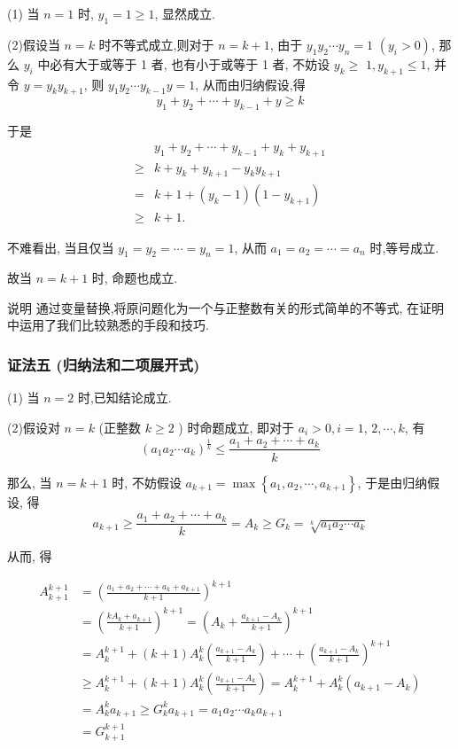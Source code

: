 (1) 当 $n=1$ 时, $y_{1}=1 \geqslant 1$, 显然成立.

(2)假设当 $n=k$ 时不等式成立,则对于 $n=k+1$, 由于 $y_{1} y_{2} \cdots y_{n}=1$ $\left(y_{i}>0\right)$, 那么 $y_{i}$ 中必有大于或等于 1 者, 也有小于或等于 1 者, 不妨设 $y_{k} \geqslant$ $1, y_{k+1} \leqslant 1$, 并令 $y=y_{k} y_{k+1}$, 则 $y_{1} y_{2} \cdots y_{k-1} y=1$, 从而由归纳假设,得
$$
y_{1}+y_{2}+\cdots+y_{k-1}+y \geqslant k
$$

于是
$$
\begin{aligned}
& y_{1}+y_{2}+\cdots+y_{k-1}+y_{k}+y_{k+1} \\
\geqslant & k+y_{k}+y_{k+1}-y_{k} y_{k+1} \\
= & k+1+\left(y_{k}-1\right)\left(1-y_{k+1}\right) \\
\geqslant & k+1 .
\end{aligned}
$$

不难看出, 当且仅当 $y_{1}=y_{2}=\cdots=y_{n}=1$, 从而 $a_{1}=a_{2}=\cdots=a_{n}$ 时,等号成立.

故当 $n=k+1$ 时, 命题也成立.

说明 通过变量替换,将原问题化为一个与正整数有关的形式简单的不等式, 在证明中运用了我们比较熟悉的手段和技巧.

\subsubsection*{证法五 (归纳法和二项展开式)}

(1) 当 $n=2$ 时,已知结论成立.

(2)假设对 $n=k$ (正整数 $k \geqslant 2$ ) 时命题成立, 即对于 $a_{i}>0, i=1$, $2, \cdots, k$, 有
$$
\left(a_{1} a_{2} \cdots a_{k}\right)^{\frac{1}{k}} \leqslant \frac{a_{1}+a_{2}+\cdots+a_{k}}{k}
$$

那么, 当 $n=k+1$ 时, 不妨假设 $a_{k+1}=\max \left\{a_{1}, a_{2}, \cdots, a_{k+1}\right\}$, 于是由归纳假设, 得
$$
a_{k+1} \geqslant \frac{a_{1}+a_{2}+\cdots+a_{k}}{k}=A_{k} \geqslant G_{k}=\sqrt[k]{a_{1} a_{2} \cdots a_{k}}
$$

从而, 得


\begin{align*}
A_{k+1}^{k+1} & =\left(\frac{a_{1}+a_{2}+\cdots+a_{k}+a_{k+1}}{k+1}\right)^{k+1} \\
& =\left(\frac{k A_{k}+a_{k+1}}{k+1}\right)^{k+1}=\left(A_{k}+\frac{a_{k+1}-A_{k}}{k+1}\right)^{k+1}  \tag{8}\\
& =A_{k}^{k+1}+(k+1) A_{k}^{k}\left(\frac{a_{k+1}-A_{k}}{k+1}\right)+\cdots+\left(\frac{a_{k+1}-A_{k}}{k+1}\right)^{k+1}  \tag{9}\\
& \geqslant A_{k}^{k+1}+(k+1) A_{k}^{k}\left(\frac{a_{k+1}-A_{k}}{k+1}\right)=A_{k}^{k+1}+A_{k}^{k}\left(a_{k+1}-A_{k}\right)  \tag{1}\\
& =A_{k}^{k} a_{k+1} \geqslant G_{k}^{k} a_{k+1}=a_{1} a_{2} \cdots a_{k} a_{k+1}  \tag{1}\\
& =G_{k+1}^{k+1} \tag{12}
\end{align*}


